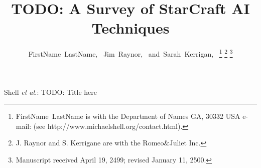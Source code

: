 \documentclass[journal]{IEEEtran}
\begin{document}
%
\title{TODO: A Survey of StarCraft AI Techniques}
%
%
%

\author{FirstName~LastName,~
        Jim~Raynor,~
        and~Sarah~Kerrigan,~%
\thanks{FirstName~LastName is with the Department of Names
GA, 30332 USA e-mail: (see http://www.michaelshell.org/contact.html).}%
\thanks{J. Raynor and S. Kerrigane are with the Romeo\&Juliet Inc.}%
\thanks{Manuscript received April 19, 2499; revised January 11, 2500.}}

% 
%

%
{Shell \MakeLowercase{\textit{et al.}}: TODO: Title here}

\maketitle
\end{document}
